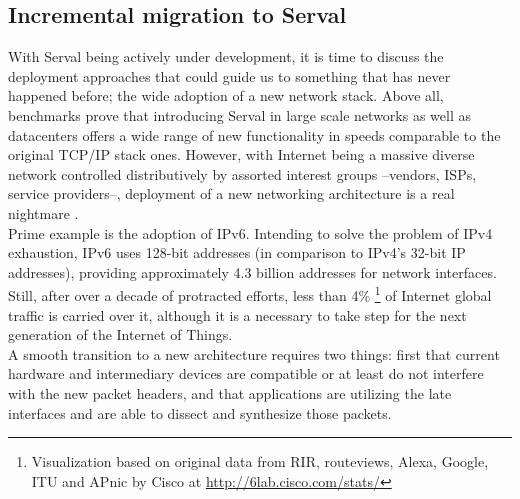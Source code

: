 \newpage
\subsection{Incremental migration to Serval}
With Serval being actively under development, it is time to discuss the deployment approaches that could guide us to something that has never happened before; the wide adoption of a new network stack.
Above all, benchmarks prove that introducing Serval in large scale networks as well as datacenters offers a wide range of new functionality in speeds comparable to the original TCP/IP stack ones. However, with Internet being a massive diverse network controlled distributively by assorted interest groups --vendors, ISPs, service providers--, deployment of a new networking architecture is a real nightmare \cite{Podmayersky2011}.
\\ \indent Prime example is the adoption of IPv6. Intending to solve the problem of IPv4 exhaustion, IPv6 uses 128-bit addresses (in comparison to IPv4's 32-bit IP addresses), providing approximately 4.3 billion addresses for network interfaces. Still, after over a decade of protracted efforts, less than 4\% \footnote{Visualization based on original data from RIR, routeviews, Alexa, Google, ITU and APnic by Cisco at \url{http://6lab.cisco.com/stats/}} of Internet global traffic is carried over it, although it is a necessary to take step for the next generation of the Internet of Things. 
\\ \indent A smooth transition to a new architecture requires two things: first that current hardware and intermediary devices are compatible or at least do not interfere with the new packet headers, and that applications are utilizing the late interfaces and are able to dissect and synthesize those packets.

